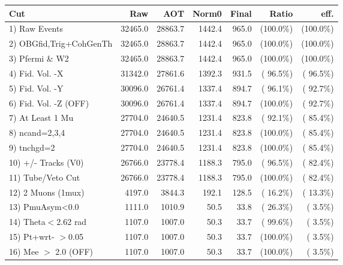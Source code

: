  \begin{table}[h!]\centering
 \begin{tabular}{||l||r|r|r|r|r|r||}
 \hline
 \hline
 Cut & Raw & AOT & Norm0 & Final & Ratio & eff.       \\
 \hline
  1) Raw Events           &      32465.0 &      28863.7 &       1442.4 &        965.0 & (100.0\%) & (100.0\%) \\
  2) OBGfid,Trig+CohGenTh &      32465.0 &      28863.7 &       1442.4 &        965.0 & (100.0\%) & (100.0\%) \\
  3) Pfermi \& W2         &      32465.0 &      28863.7 &       1442.4 &        965.0 & (100.0\%) & (100.0\%) \\
  4) Fid. Vol. -X         &      31342.0 &      27861.6 &       1392.3 &        931.5 & ( 96.5\%) & ( 96.5\%) \\
  5) Fid. Vol. -Y         &      30096.0 &      26761.4 &       1337.4 &        894.7 & ( 96.1\%) & ( 92.7\%) \\
  6) Fid. Vol. -Z (OFF)   &      30096.0 &      26761.4 &       1337.4 &        894.7 & (100.0\%) & ( 92.7\%) \\
  7) At Least 1 Mu        &      27704.0 &      24640.5 &       1231.4 &        823.8 & ( 92.1\%) & ( 85.4\%) \\
  8) ncand=2,3,4          &      27704.0 &      24640.5 &       1231.4 &        823.8 & (100.0\%) & ( 85.4\%) \\
  9) tnchgd=2             &      27704.0 &      24640.5 &       1231.4 &        823.8 & (100.0\%) & ( 85.4\%) \\
 10) +/- Tracks (V0)      &      26766.0 &      23778.4 &       1188.3 &        795.0 & ( 96.5\%) & ( 82.4\%) \\
 11) Tube/Veto Cut        &      26766.0 &      23778.4 &       1188.3 &        795.0 & (100.0\%) & ( 82.4\%) \\
 12) 2 Muons (1mux)       &       4197.0 &       3844.3 &        192.1 &        128.5 & ( 16.2\%) & ( 13.3\%) \\
 13) PmuAsym<0.0          &       1111.0 &       1010.9 &         50.5 &         33.8 & ( 26.3\%) & (  3.5\%) \\
 14) Theta$<$2.62 rad     &       1107.0 &       1007.0 &         50.3 &         33.7 & ( 99.6\%) & (  3.5\%) \\
 15) Pt+wrt- $>$0.05      &       1107.0 &       1007.0 &         50.3 &         33.7 & (100.0\%) & (  3.5\%) \\
 16) Mee $>$ 2.0  (OFF)   &       1107.0 &       1007.0 &         50.3 &         33.7 & (100.0\%) & (  3.5\%) \\

\end{tabular}
\end{table}
